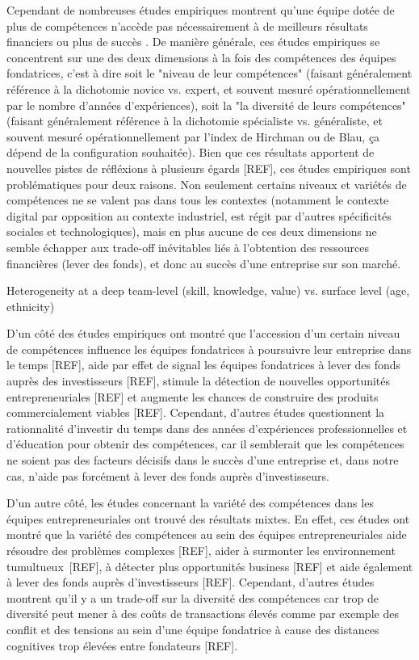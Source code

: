 \documentclass[11pt]{article}
\begin{document}
Cependant de nombreuses études empiriques montrent qu'une équipe dotée de plus de compétences n'accède pas nécessairement à de meilleurs résultats financiers ou plus de succès \citep{pierce2013too}. De manière générale, ces études empiriques se concentrent sur une des deux dimensions à la fois des compétences des équipes fondatrices, c'est à dire soit le "niveau de leur compétences" (faisant généralement référence à la dichotomie novice vs. expert, et souvent mesuré opérationnellement par le nombre d'années d'expériences), soit la "la diversité de leurs compétences" (faisant généralement référence à la dichotomie spécialiste vs. généraliste, et souvent mesuré opérationnellement par l'index de Hirchman ou de Blau, ça dépend de la configuration souhaitée). Bien que ces résultats apportent de nouvelles pistes de réfléxions à plusieurs égards [REF], ces études empiriques sont problématiques pour deux raisons. Non seulement certains niveaux et variétés de compétences ne se valent pas dans tous les contextes (notamment le contexte digital par opposition au contexte industriel, est régit par d'autres spécificités sociales et technologiques), mais en plus aucune de ces deux dimensions ne semble échapper aux trade-off inévitables liés à l'obtention des ressources financières (lever des fonds), et donc au succès d'une entreprise sur son marché.

Heterogeneity at a deep team-level (skill, knowledge, value) vs. surface level (age, ethnicity)

D'un côté des études empiriques ont montré que l'accession d'un certain niveau de compétences influence les équipes fondatrices à poursuivre leur entreprise dans le temps [REF], aide par effet de signal les équipes fondatrices à lever des fonds auprès des investisseurs [REF], stimule la détection de nouvelles opportunités entrepreneuriales [REF] et augmente les chances de construire des produits commercialement viables [REF]. Cependant, d'autres études questionnent la rationnalité d'investir du temps dans des années d'expériences professionnelles et d'éducation pour obtenir des compétences, car il semblerait que les compétences ne soient pas des facteurs décisifs dans le succès d'une entreprise et, dans notre cas, n'aide pas forcément à lever des fonds auprès d'investisseurs.

D'un autre côté, les études concernant la variété des compétences dans les équipes entrepreneuriales ont trouvé des résultats mixtes. En effet, ces études ont montré que la variété des compétences au sein des équipes entrepreneuriales aide résoudre des problèmes complexes [REF], aider à surmonter les environnement tumultueux [REF], à détecter plus opportunités business [REF] et aide également à lever des fonds auprès d'investisseurs [REF]. Cependant, d'autres études montrent qu'il y a un trade-off sur la diversité des compétences car trop de diversité peut mener à des coûts de transactions élevés comme par exemple des conflit et des tensions au sein d'une équipe fondatrice à cause des distances cognitives trop élevées entre fondateurs [REF].
\end{document}

